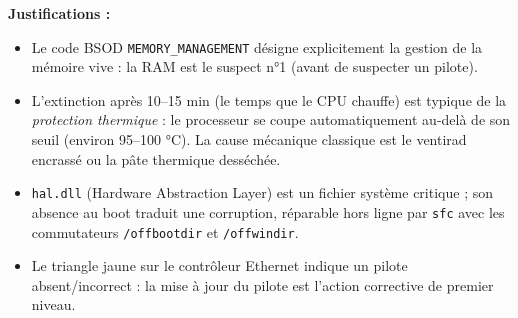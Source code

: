\documentclass[11pt]{article}
\newcommand{\cle}[1]{{\popxbold\color{popdark}#1}}
\begin{document}
\begin{corrige}
\textbf{Justifications :}
\begin{itemize}
    \item Le code BSOD \texttt{MEMORY\_MANAGEMENT} désigne explicitement la gestion de la mémoire vive : la RAM est le suspect n°1 (avant de suspecter un pilote).
    \item L'extinction après 10--15 min (le temps que le CPU chauffe) est typique de la \emph{protection thermique} : le processeur se coupe automatiquement au-delà de son seuil (environ 95--100 °C). La cause mécanique classique est le ventirad encrassé ou la pâte thermique desséchée.
    \item \texttt{hal.dll} (Hardware Abstraction Layer) est un \cle{fichier système} critique ; son absence au boot traduit une corruption, réparable hors ligne par \texttt{sfc} avec les commutateurs \texttt{/offbootdir} et \texttt{/offwindir}.
    \item Le triangle jaune sur le contrôleur Ethernet indique un pilote absent/incorrect : la mise à jour du pilote est l'action corrective de premier niveau.
\end{itemize}
\end{corrige}
\end{document}
